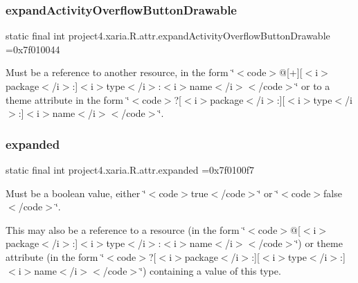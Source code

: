 \subsubsection{\texorpdfstring{expand\+Activity\+Overflow\+Button\+Drawable}{expandActivityOverflowButtonDrawable}}
{\footnotesize\ttfamily static final int project4.\+xaria.\+R.\+attr.\+expand\+Activity\+Overflow\+Button\+Drawable =0x7f010044\hspace{0.3cm}{\ttfamily [static]}}

Must be a reference to another resource, in the form \char`\"{}$<$code$>$@\mbox{[}+\mbox{]}\mbox{[}$<$i$>$package$<$/i$>$\+:\mbox{]}$<$i$>$type$<$/i$>$\+:$<$i$>$name$<$/i$>$$<$/code$>$\char`\"{} or to a theme attribute in the form \char`\"{}$<$code$>$?\mbox{[}$<$i$>$package$<$/i$>$\+:\mbox{]}\mbox{[}$<$i$>$type$<$/i$>$\+:\mbox{]}$<$i$>$name$<$/i$>$$<$/code$>$\char`\"{}. \mbox{\label{classproject4_1_1xaria_1_1R_1_1attr_aca8c18f895ce6f487f269b27904f9673}} 
\subsubsection{\texorpdfstring{expanded}{expanded}}
{\footnotesize\ttfamily static final int project4.\+xaria.\+R.\+attr.\+expanded =0x7f0100f7\hspace{0.3cm}{\ttfamily [static]}}

Must be a boolean value, either \char`\"{}$<$code$>$true$<$/code$>$\char`\"{} or \char`\"{}$<$code$>$false$<$/code$>$\char`\"{}. 

This may also be a reference to a resource (in the form \char`\"{}$<$code$>$@\mbox{[}$<$i$>$package$<$/i$>$\+:\mbox{]}$<$i$>$type$<$/i$>$\+:$<$i$>$name$<$/i$>$$<$/code$>$\char`\"{}) or theme attribute (in the form \char`\"{}$<$code$>$?\mbox{[}$<$i$>$package$<$/i$>$\+:\mbox{]}\mbox{[}$<$i$>$type$<$/i$>$\+:\mbox{]}$<$i$>$name$<$/i$>$$<$/code$>$\char`\"{}) containing a value of this type. \mbox{\label{classproject4_1_1xaria_1_1R_1_1attr_a24bda2e246427c0b3c408a2f9591b724}} 
